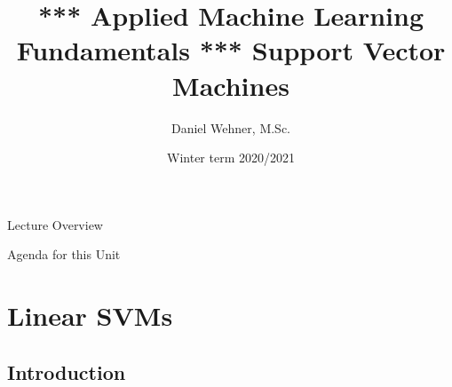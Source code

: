 


\title[Support Vector Machines]{*** Applied Machine Learning Fundamentals *** Support Vector Machines}
\author{Daniel Wehner, M.Sc.}
\date{Winter term 2020/2021}




\maketitlepage


\begin{frame}{Lecture Overview}{}
\end{frame}


\begin{frame}{Agenda for this Unit}
	\begin{multicols}{2}
		\tableofcontents
	\end{multicols}
\end{frame}


\section{Linear SVMs}

\subsection{Introduction}

